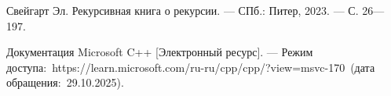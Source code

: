 \begin{thebibliography}{}
	
	Свейгарт Эл. {Рекурсивная книга о рекурсии}. --- СПб.: Питер, 2023. --- С. 26---197.
	
	Документация Microsoft C++ [Электронный ресурс]. --- Режим доступа:~https://learn.microsoft.com/ru-ru/cpp/cpp/?view=msvc-170~(дата обращения:~29.10.2025).
	
\end{thebibliography}
